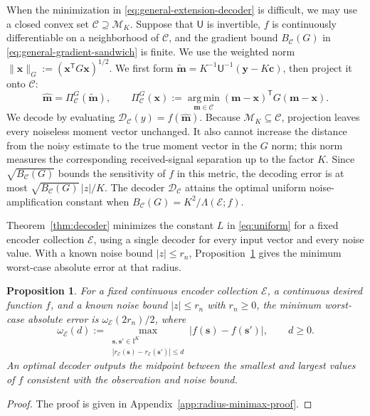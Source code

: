 \documentclass[journal,12pt,onecolumn,draftclsnofoot]{IEEEtran}
\newtheorem{proposition}{Proposition}
\newcommand{\enc}{\mathscr{E}}\newcommand{\dec}{\mathscr{D}}\newcommand{\R}{\mathbb R}\newcommand{\C}{\mathbb C}
\newcommand{\T}{\mathsf T}\newcommand{\suc}{\succeq}
\begin{document}
When the minimization in \eqref{eq:general-extension-decoder} is difficult, we may use a closed convex set
$\mathcal C\supseteq\mathcal M_K$. Suppose that $\mathsf U$ is
invertible, $f$ is continuously differentiable on a neighborhood
of $\mathcal C$, and the gradient bound $B_{\mathcal C}(G)$ in \eqref{eq:general-gradient-sandwich} is finite.
We use the weighted norm
$\|\boldsymbol x\|_G:=(\boldsymbol x^\T G\boldsymbol x)^{1/2}$.
We first form
$\tilde{\boldsymbol m}=K^{-1}\mathsf U^{-1}
(\boldsymbol y-K\boldsymbol c)$, then project it onto $\mathcal C$:
$$
\hat{\boldsymbol m}=\Pi_{\mathcal C}^G
(\tilde{\boldsymbol m}),\qquad
\Pi_{\mathcal C}^G(\boldsymbol x):=
\operatorname*{arg\,min}_{\boldsymbol m\in\mathcal C}
(\boldsymbol m-\boldsymbol x)^\T G(\boldsymbol m-\boldsymbol x).
$$
We decode by evaluating
$\dec_{\mathcal C}(y)=f(\hat{\boldsymbol m})$.
Because $\mathcal M_K\subseteq\mathcal C$, projection leaves every noiseless moment vector unchanged. It also cannot increase the distance from the noisy estimate to the true moment vector in the $G$ norm; this norm measures the corresponding received-signal separation up to the factor $K$. Since
$\sqrt{B_{\mathcal C}(G)}$ bounds the sensitivity of $f$ in this
metric, the decoding error is at most
$\sqrt{B_{\mathcal C}(G)}\,|z|/K$. The decoder $\dec_{\mathcal C}$ attains the optimal
uniform noise-amplification constant when
$B_{\mathcal C}(G)=K^2/\Lambda(\enc;f)$.


Theorem~\ref{thm:decoder} minimizes the constant $L$ in
\eqref{eq:uniform} for a fixed encoder collection $\enc$, using a single decoder for every input vector and every noise value. With a known noise bound $|z|\le r_n$, Proposition~\ref{prop:radius-minimax} gives the minimum worst-case absolute error at that radius. 

\begin{proposition}\label{prop:radius-minimax}
For a fixed continuous encoder collection $\enc$, a continuous desired function $f$,
and a known noise bound $|z|\le r_n$ with $r_n\ge0$, the minimum worst-case
absolute error is $\omega_\enc(2r_n)/2$, where
$$
\omega_\enc(d):=
\max_{\substack{
\boldsymbol s,\boldsymbol s'\in\mathbb I^K\\
|r_\enc(\boldsymbol s)-r_\enc(\boldsymbol s')|\le d}}
|f(\boldsymbol s)-f(\boldsymbol s')|,
\qquad d\ge0.
$$
An optimal decoder outputs the midpoint between the smallest and largest
values of $f$ consistent with the observation and noise bound.
\end{proposition}
\begin{proof}
    The proof is given in Appendix~\ref{app:radius-minimax-proof}.
\end{proof}
\end{document}
